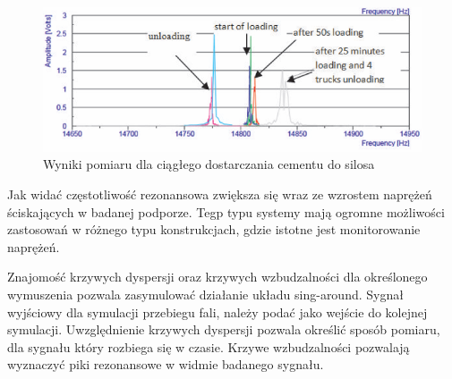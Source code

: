 \begin{figure}[h]
\centering
\includegraphics[width=14cm]{Zdjecia/2/sing_around_wyniki}
\caption{Wyniki pomiaru dla ciągłego dostarczania cementu do silosa}
\label{fig:sing_around_wyniki}
\end{figure}

Jak widać częstotliwość rezonansowa zwiększa się wraz ze wzrostem naprężeń ściskających w badanej podporze. Tegp typu systemy mają ogromne możliwości zastosowań w różnego typu konstrukcjach, gdzie istotne jest monitorowanie naprężeń.

Znajomość krzywych dyspersji oraz krzywych wzbudzalności dla określonego wymuszenia pozwala zasymulować działanie układu sing-around. Sygnał wyjściowy dla symulacji przebiegu fali, należy podać jako wejście do kolejnej symulacji. Uwzględnienie krzywych dyspersji pozwala określić sposób pomiaru, dla sygnału który rozbiega się w czasie. Krzywe wzbudzalności pozwalają wyznaczyć piki rezonansowe w widmie badanego sygnału.

